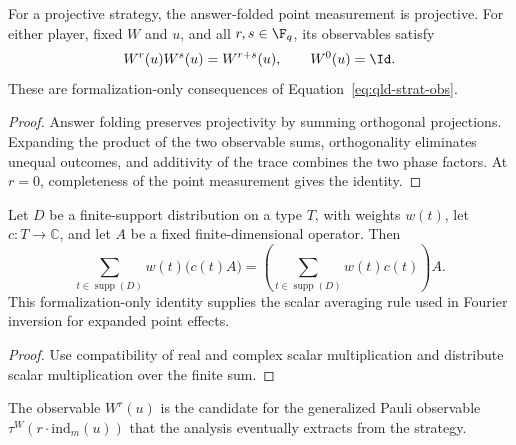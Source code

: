 \begin{lemma}
\label{lem:point-observable-multiplication}
\leanok
{}
For a projective strategy, the answer-folded point measurement is projective.
For either player, fixed $W$ and $u$, and all $r,s\in\F_q$, its observables satisfy
\[
W^r(u)W^s(u)=W^{r+s}(u),\qquad W^0(u)=\Id.
\]
These are formalization-only consequences of Equation~\eqref{eq:qld-strat-obs}.
\end{lemma}
\begin{proof}
\leanok
Answer folding preserves projectivity by summing orthogonal projections.
Expanding the product of the two observable sums, orthogonality eliminates
unequal outcomes, and additivity of the trace combines the two phase factors.
At $r=0$, completeness of the point measurement gives the identity.
\end{proof}

\begin{lemma}
\label{lem:operator-average-scalar-constant}
\leanok
Let $D$ be a finite-support distribution on a type $T$, with weights $w(t)$,
let $c:T\to\mathbb C$, and let $A$ be a fixed finite-dimensional operator.
Then
\[
\sum_{t\in\operatorname{supp}(D)} w(t)\bigl(c(t)A\bigr)
=\left(\sum_{t\in\operatorname{supp}(D)}w(t)c(t)\right)A.
\]
This formalization-only identity supplies the scalar averaging rule used in
Fourier inversion for expanded point effects.
\end{lemma}
\begin{proof}
\leanok
Use compatibility of real and complex scalar multiplication and distribute
scalar multiplication over the finite sum.
\end{proof}

The observable $W^r(u)$ is the candidate for the generalized Pauli
observable $\tau^W(r \cdot \mathrm{ind}_m(u))$ that the analysis eventually
extracts from the strategy.

